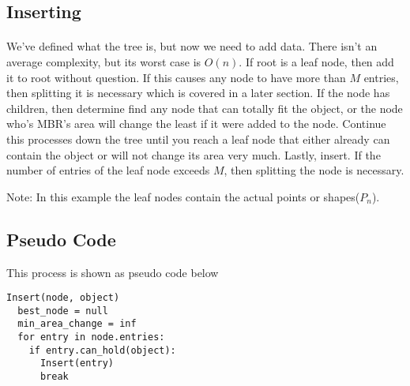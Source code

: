 \documentclass{article}
\begin{document}
\begin{multicols}{2}[]
\section{Inserting}
\paragraph{}
We've defined what the tree is, but now we need to add data. There isn't an average complexity, but its worst
case is $O(n)$. If root is a leaf node, then add it to root without question. If this causes any node to have
 more than $M$ entries, then splitting it is necessary
which is covered in a later section. If the node has children, then determine find any node that can totally
fit the object, or the node who's MBR's area will change the least if it were added to the node. Continue this
processes down the tree until you reach a leaf node that either already can contain the object or will not change
its area very much. Lastly, insert. If the number of entries of the leaf node exceeds $M$, then splitting the
node is necessary.

\begin{minipage}{\linewidth}
\centering
{}

Note: In this example the leaf nodes contain the actual points or shapes($P_n$).
\end{minipage}

\subsection*{Pseudo Code}
This process is shown as pseudo code below


\begin{lstlisting}
Insert(node, object)
  best_node = null
  min_area_change = inf
  for entry in node.entries:
    if entry.can_hold(object):
      Insert(entry)
      break
    

\end{lstlisting}
\end{multicols}
\end{document}
